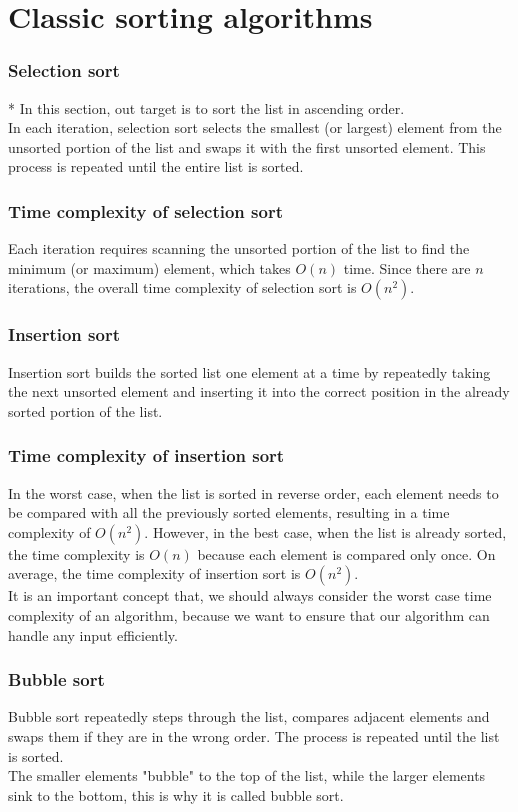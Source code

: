 \documentclass[xcolor=dvipsnames]{beamer}
\begin{document}
    \section{Classic sorting algorithms}
    \begin{frame}
        \frametitle{Selection sort}
        * In this section, out target is to sort the list in ascending order.\\
        In each iteration, selection sort selects the smallest (or largest) element from the unsorted portion of the list and swaps it with the first unsorted element. This process is repeated until the entire list is sorted.\\
    \end{frame}
    \begin{frame}
        \frametitle{Time complexity of selection sort}
        Each iteration requires scanning the unsorted portion of the list to find the minimum (or maximum) element, which takes $O(n)$ time. Since there are $n$ iterations, the overall time complexity of selection sort is $O(n^2)$.\\
    \end{frame}
    \begin{frame}
        \frametitle{Insertion sort}
        Insertion sort builds the sorted list one element at a time by repeatedly taking the next unsorted element and inserting it into the correct position in the already sorted portion of the list.\\
    \end{frame}
    \begin{frame}
        \frametitle{Time complexity of insertion sort}
        In the worst case, when the list is sorted in reverse order, each element needs to be compared with all the previously sorted elements, resulting in a time complexity of $O(n^2)$. However, in the best case, when the list is already sorted, the time complexity is $O(n)$ because each element is compared only once. On average, the time complexity of insertion sort is $O(n^2)$.\\
        It is an important concept that, we should always consider the worst case time complexity of an algorithm, because we want to ensure that our algorithm can handle any input efficiently.\\
    \end{frame}
    \begin{frame}
        \frametitle{Bubble sort}
        Bubble sort repeatedly steps through the list, compares adjacent elements and swaps them if they are in the wrong order. The process is repeated until the list is sorted.\\
        The smaller elements "bubble" to the top of the list, while the larger elements sink to the bottom, this is why it is called bubble sort.\\
    \end{frame}
\end{document}
